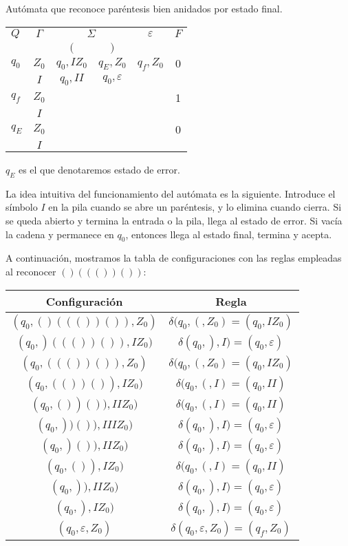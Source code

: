 \newpage
\begin{ex}
Autómata que reconoce paréntesis bien anidados por estado final. 
\begin{center}
\begin{tabular}{|l|c|c|c|c|c|}
\hline 
$Q$ & $\Gamma $ & \multicolumn{2}{|c|}{$\Sigma $} & $\varepsilon$ & $F$ \\ \cline{3-4}
 & & $($ & $)$ & & \\ \hline
$q_0$ & $Z_0$ & $q_0,IZ_0$ & $q_E,Z_0$& $q_f,Z_0$ & $0$ \\ \cline{2-5}
 & $I$ & $q_0,II$ & $q_0,\varepsilon $ & &  \\ \hline
$q_f$ & $Z_0$ & & & & 1 \\ \cline{2-5}
& $I$ & & & & \\ \hline
$q_E$ & $Z_0$& & & & 0 \\ \cline{2-5}
& $I$ & & & &  \\ \hline
\end{tabular}
\end{center}

\begin{nota}
$q_E$ es el que denotaremos estado de error. 
\end{nota}

La idea intuitiva del funcionamiento del autómata es la siguiente. Introduce  el símbolo $I$ en la pila cuando se abre un paréntesis, y lo elimina cuando cierra. Si se queda abierto y termina la entrada o la pila, llega al estado de error. Si vacía la cadena y permanece en $q_0$, entonces llega al estado final, termina y acepta.
 
A continuación, mostramos la tabla de configuraciones con las reglas empleadas al reconocer $()((())())$:

\begin{center}
\begin{tabular}{|c|c|}
\hline
\textbf{Configuración} & \textbf{Regla} \\ \hline
$(q_0,()((())()),Z_0)$ & $\delta(q_0,(,Z_0)=(q_0,IZ_0)$ \\ \hline
$(q_0,)((())()),IZ_0)$ & $\delta(q_0,),I) = (q_0,\varepsilon)$ \\ \hline
$(q_0,((())()),Z_0)$ & $\delta(q_0,(,Z_0)=(q_0,IZ_0)$ \\ \hline
$(q_0,(())()),IZ_0)$ & $\delta(q_0,(,I)=(q_0,II)$ \\ \hline
$(q_0,())()),IIZ_0)$ & $\delta(q_0,(,I)=(q_0,II)$ \\ \hline
$(q_0,))()),IIIZ_0)$ & $\delta(q_0,),I)=(q_0,\varepsilon)$ \\ \hline
$(q_0,)()),IIZ_0)$ & $\delta(q_0,),I)=(q_0,\varepsilon)$ \\ \hline
$(q_0,()),IZ_0)$ & $\delta(q_0,(,I)=(q_0,II)$ \\ \hline
$(q_0,)),IIZ_0)$ & $\delta(q_0,),I)=(q_0,\varepsilon)$ \\ \hline
$(q_0,),IZ_0)$ & $\delta(q_0,),I)=(q_0,\varepsilon)$ \\ \hline
$(q_0,\varepsilon,Z_0)$ & $\delta(q_0,\varepsilon,Z_0)=(q_f,Z_0)$ \\ \hline
\end{tabular}
\end{center}
\end{ex}
